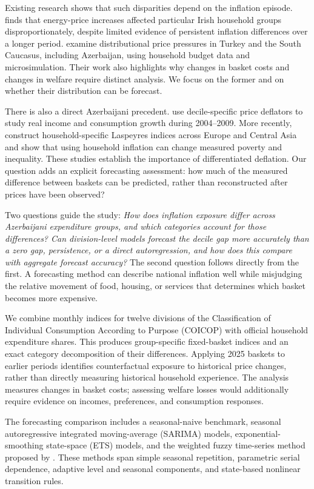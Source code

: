 \documentclass[11pt,a4paper]{article}
\begin{document}
Existing research shows that such disparities depend on the inflation episode. \citet{lydon2022} finds that energy-price increases affected particular Irish household groups disproportionately, despite limited evidence of persistent inflation differences over a longer period. \citet{can2025} examine distributional price pressures in Turkey and the South Caucasus, including Azerbaijan, using household budget data and microsimulation. Their work also highlights why changes in basket costs and changes in welfare require distinct analysis. We focus on the former and on whether their distribution can be forecast.

There is also a direct Azerbaijani precedent. \citet{walewski2010} use decile-specific price deflators to study real income and consumption growth during 2004--2009. More recently, \citet{lokshin2025} construct household-specific Laspeyres indices across Europe and Central Asia and show that using household inflation can change measured poverty and inequality. These studies establish the importance of differentiated deflation. Our question adds an explicit forecasting assessment: how much of the measured difference between baskets can be predicted, rather than reconstructed after prices have been observed?

Two questions guide the study: \emph{How does inflation exposure differ across Azerbaijani expenditure groups, and which categories account for those differences? Can division-level models forecast the decile gap more accurately than a zero gap, persistence, or a direct autoregression, and how does this compare with aggregate forecast accuracy?} The second question follows directly from the first. A forecasting method can describe national inflation well while misjudging the relative movement of food, housing, or services that determines which basket becomes more expensive.

We combine monthly indices for twelve divisions of the Classification of Individual Consumption According to Purpose (COICOP) with official household expenditure shares. This produces group-specific fixed-basket indices and an exact category decomposition of their differences. Applying 2025 baskets to earlier periods identifies counterfactual exposure to historical price changes, rather than directly measuring historical household experience. The analysis measures changes in basket costs; assessing welfare losses would additionally require evidence on incomes, preferences, and consumption responses.

The forecasting comparison includes a seasonal-naive benchmark, seasonal autoregressive integrated moving-average (SARIMA) models, exponential-smoothing state-space (ETS) models, and the weighted fuzzy time-series method proposed by \citet{yu2005}. These methods span simple seasonal repetition, parametric serial dependence, adaptive level and seasonal components, and state-based nonlinear transition rules.
\end{document}
